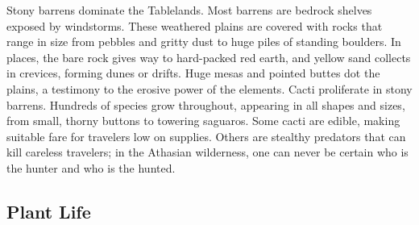\begin{multicols}{2}
Stony barrens dominate the Tablelands. Most barrens are bedrock shelves exposed
by windstorms. These weathered plains are covered with rocks that range in size
from pebbles and gritty dust to huge piles of standing boulders. In places,
the bare rock gives way to hard-packed red earth, and yellow sand collects in
crevices, forming dunes or drifts. Huge mesas and pointed buttes dot the plains,
a testimony to the erosive power of the elements. Cacti proliferate in stony
barrens. Hundreds of species grow throughout, appearing in all shapes and
sizes, from small, thorny buttons to towering saguaros. Some cacti are edible,
making suitable fare for travelers low on supplies. Others are stealthy
predators that can kill careless travelers; in the Athasian wilderness, one
can never be certain who is the hunter and who is the hunted.

\end{multicols}

\subsection{Plant Life}

